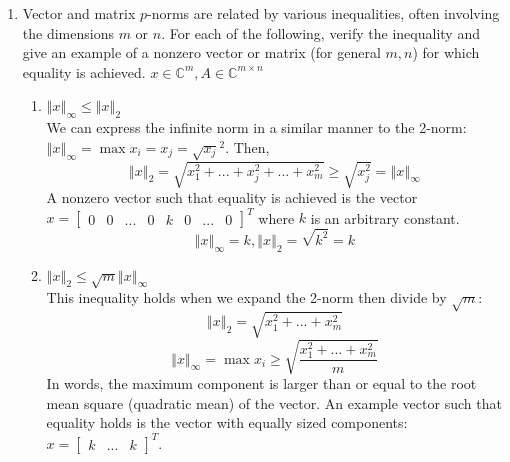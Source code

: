 \documentclass[12pt]{article}
\numberwithin{equation}{section}
\newcommand{\norm}[1]{\left\Vert#1\right\Vert}
\newenvironment{proof}[1][Proof]{\textbf{#1.} }{\ \rule{0.5em}{0.5em}}
\begin{document}
\begin{enumerate}
\begin{proof}
    \begin{enumerate}
    \item Since the matrix-vector product $Wx$ gives a new vector $z$, we know $$\norm{x}_W=\norm{Wx}=\norm{z}=(\sum_{i=1}^m|z_i|^p)^{1/p}\geq 0$$
        because each $|z_i|\geq 0$.
        As $W$ is nonsingular, we also know that $Wx=0\iff x=0$, then
        $$\norm{x}_W=\norm{Wx}=\norm{z}=0\iff z=0\iff Wx=0\iff x=0.$$
    \item Following the same logic as (a), we have
    $$\norm{x+y}_W=\norm{W(x+y)}=\norm{Wx+Wy}=\norm{z+u}$$
    where $Wx=z$ and $Wy=u$.We then examine two cases: Case (1) - Both $z$ and $u$ have components $z_i$ and $u_i$ that have the same sign for each $i$. Then, $$\norm{z+u}=\norm{z}+\norm{u}.$$ Case (2) - Without loss of generality, choose $z$ to contain at least one negatively valued component in a position where $u$ has a positively valued component. Then,
    $$\norm{z+u}\leq\norm{u}+\norm{z}.$$
    \item $$\norm{\alpha x}_W=\norm{W(\alpha x)}=\norm{\alpha Wx}=\norm{\alpha z}=|\alpha|\norm{z}$$
    \end{enumerate}

\end{proof}

\item Vector and matrix $p$-norms are related by various inequalities, often involving the dimensions $m$ or $n$. For each of the following, verify the inequality and give an example of a nonzero vector or matrix (for general $m,n$) for which equality is achieved. $x\in\mathbb{C}^m,A\in\mathbb{C}^{m\times n}$
    \begin{enumerate}
        \item $\norm{x}_\infty\leq\norm{x}_2$\\
        We can express the infinite norm in a similar manner to the 2-norm: $\norm{x}_\infty=\max{x_i}=x_j=\sqrt{x_j}^2$. Then, $$\norm{x}_2=\sqrt{x_1^2+...+x_j^2+...+x_m^2}\geq\sqrt{x_j^2}=\norm{x}_\infty$$
        A nonzero vector such that equality is achieved is the vector $x=[\begin{array}{cccccccc} 0&0&...&0&k&0&...&0\end{array}]^T$ where $k$ is an arbitrary constant.
        $$\norm{x}_\infty=k,\norm{x}_2=\sqrt{k^2}=k$$
        \item $\norm{x}_2\leq\sqrt{m}\norm{x}_\infty$\\
        This inequality holds when we expand the 2-norm then divide by $\sqrt{m}$:
        $$\norm{x}_2=\sqrt{x_1^2+...+x_m^2}$$
        $$\norm{x}_\infty=\max{x_i}\geq\sqrt{\frac{x_1^2+...+x_m^2}{m}}$$
        In words, the maximum component is larger than or equal to the root mean square (quadratic mean) of the vector. An example vector such that equality holds is the vector with equally sized components: $x=[\begin{array}{ccc}k&...&k\end{array}]^T.$


\end{enumerate}
\end{enumerate}
\end{document}

